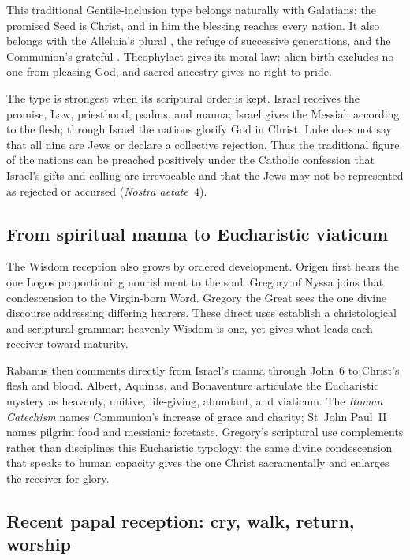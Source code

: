 This traditional Gentile-inclusion type belongs naturally with Galatians: the
promised Seed is Christ, and in him the blessing reaches every nation. It also
belongs with the Alleluia's plural , the refuge of successive
generations, and the Communion's grateful . Theophylact gives its
moral law: alien birth excludes no one from pleasing God, and sacred ancestry
gives no right to pride.

The type is strongest when its scriptural order is kept. Israel receives the
promise, Law, priesthood, psalms, and manna; Israel gives the Messiah according
to the flesh; through Israel the nations glorify God in Christ. Luke does not
say that all nine are Jews or declare a collective rejection. Thus the
traditional figure of the nations can be preached positively under the
Catholic confession that Israel's gifts and calling are irrevocable and that
the Jews may not be represented as rejected or accursed (\emph{Nostra
aetate}~4).

\subsection*{From spiritual manna to Eucharistic viaticum}

The Wisdom reception also grows by ordered development. Origen first hears the
one Logos proportioning nourishment to the soul. Gregory of Nyssa joins that
condescension to the Virgin-born Word. Gregory the Great sees the one divine
discourse addressing differing hearers. These direct uses establish a
christological and scriptural grammar: heavenly Wisdom is one, yet gives what
leads each receiver toward maturity.

Rabanus then comments directly from Israel's manna through John~6 to Christ's
flesh and blood. Albert, Aquinas, and Bonaventure articulate the Eucharistic
mystery as heavenly, unitive, life-giving, abundant, and viaticum. The
\emph{Roman Catechism} names Communion's increase of grace and charity; St~John
Paul~II names pilgrim food and messianic foretaste. Gregory's scriptural use
complements rather than disciplines this Eucharistic typology: the same divine
condescension that speaks to human capacity gives the one Christ sacramentally
and enlarges the receiver for glory.

\subsection*{Recent papal reception: cry, walk, return, worship}

